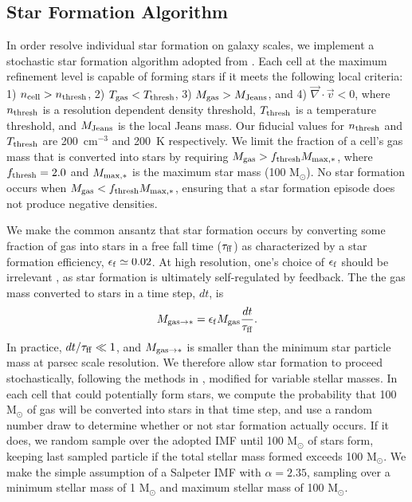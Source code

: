 \documentclass[twocolumn]{aastex61}
\begin{document}
\subsection{Star Formation Algorithm}
\label{sec:star formation}
In order resolve individual star formation on galaxy scales, we implement a stochastic star formation algorithm adopted from \cite{Goldbaum2015,Goldbaum2016}. Each cell at the maximum refinement level is capable of forming stars if it meets the following local criteria: 1) $n_{\rm cell} > n_{\rm thresh}$, 2) $T_{\rm gas} < T_{\rm thresh}$, 3) $M_{\rm gas} > M_{\rm Jeans}$, and 4) $\vec{\nabla} \cdot \vec{v} < 0$, where $n_{\rm thresh}$ is a resolution dependent density threshold, $T_{\rm thresh}$ is a temperature threshold, and $M_{\rm Jeans}$ is the local Jeans mass. Our fiducial values for $n_{\rm thresh}$ and $T_{\rm thresh}$ are 200~cm$^{-3}$ and 200~K respectively. We limit the fraction of a cell's gas mass that is converted into stars by requiring $M_{\rm gas} > f_{\rm thresh} M_{\rm max,*}$, where $f_{\rm thresh} = 2.0 $ and $M_{\rm max,*}$ is the maximum star mass (100 M$_{\odot}$). No star formation occurs when $M_{\rm gas} < f_{\rm thresh} M_{\rm max,*}$, ensuring that a star formation episode does not produce negative densities.

We make the common ansantz that star formation occurs by converting some fraction of gas into stars in a free fall time ($\tau_{\rm ff}$) as characterized by a star formation efficiency, $\epsilon_{\rm f} \simeq 0.02$. At high resolution, one's choice of $\epsilon_{\rm f}$ should be irrelevant \citep{Orr2017, FIRE2}, as star formation is ultimately self-regulated by feedback.
The the gas mass converted to stars in a time step, $dt$, is
\begin{equation}
M_{ {\rm gas} \to *} = \epsilon_{\rm f} M_{\rm gas} \frac{dt}{\tau_{\rm ff}}.
\end{equation}
In practice, $dt/\tau_{\rm ff} \ll 1$, and $M_{ {\rm gas} \to *}$ is smaller than the minimum star particle mass at parsec scale resolution. We therefore allow star formation to proceed stochastically, following the methods in \cite{Goldbaum2015, Goldbaum2016}, modified for variable stellar masses. In each cell that could potentially form stars, we compute the probability that 100 M$_{\odot}$ of gas will be converted into stars in that time step, and use a random number draw to determine whether or not star formation actually occurs. If it does, we random sample over the adopted IMF until 100 M$_{\odot}$ of stars form, keeping last sampled particle if the total stellar mass formed exceeds 100 M$_{\odot}$. We make the simple assumption of a Salpeter IMF \citep{Salpeter1955} with $\alpha = 2.35$, sampling over a minimum stellar mass of 1 M$_{\odot}$ and maximum stellar mass of 100 M$_{\odot}$. 
\end{document}
